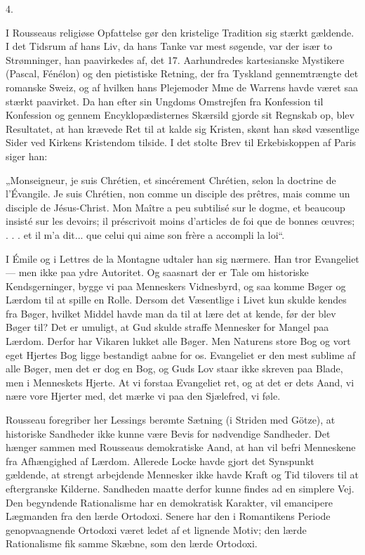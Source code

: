 \documentclass[12pt,a4paper,openany]{book}
\newcommand{\opage}[1]{\marginnote{\footnotesize\textit{[#1]}}}
\begin{document}
\begin{center}4.\end{center}

I Rousseaus religiøse Opfattelse gør den kristelige Tradition
sig stærkt gældende. I det Tidsrum af hans Liv, da hans Tanke
var mest søgende, var der især to Strømninger, han paavirkedes
af, det 17. Aarhundredes kartesianske Mystikere (Pascal,
Fénélon) og den pietistiske Retning, der fra Tyskland gennemtrængte
det romanske Sweiz, og af hvilken hans Plejemoder
Mme de Warrens havde været saa stærkt paavirket. Da han
efter sin Ungdoms Omstrejfen fra Konfession til Konfession og
gennem Encyklopædisternes Skærsild gjorde sit Regnskab op,
blev Resultatet, at han krævede Ret til at kalde sig Kristen,
skønt han skød væsentlige Sider ved Kirkens Kristendom tilside.
I det stolte Brev til Erkebiskoppen af Paris siger han:

„Monseigneur, je suis Chrétien, et sincérement Chrétien,
selon la doctrine de l’Évangile. Je suis Chrétien, non comme
un disciple des prêtres, mais comme un disciple de Jésus-Christ.
Mon Maître a peu subtilisé sur le dogme, et beaucoup insisté
sur les devoirs; il préscrivoit moins d’articles de foi que de
bonnes œuvres; . . . et il m’a dit... que celui qui aime son
frère a accompli la loi“.

I Émile og i Lettres de la Montagne udtaler han sig nærmere.
\setcounter{footnote}{0}%
\opage{156}Han tror Evangeliet --- men ikke paa ydre Autoritet. Og saasnart
der er Tale om historiske Kendsgerninger, bygge vi paa
Menneskers Vidnesbyrd, og saa komme Bøger og Lærdom til
at spille en Rolle. Dersom det Væsentlige i Livet kun skulde
kendes fra Bøger, hvilket Middel havde man da til at lære det
at kende, før der blev Bøger til? Det er umuligt, at Gud skulde
straffe Mennesker for Mangel paa Lærdom. Derfor har Vikaren
lukket alle Bøger. Men Naturens store Bog og vort eget Hjertes
Bog ligge bestandigt aabne for os. Evangeliet er den mest
sublime af alle Bøger, men det er dog en Bog, og Guds Lov
staar ikke skreven paa Blade, men i Menneskets Hjerte. At vi
forstaa Evangeliet ret, og at det er dets Aand, vi nære vore
Hjerter med, det mærke vi paa den Sjælefred, vi føle.

Rousseau foregriber her Lessings berømte Sætning (i Striden
med Götze), at historiske Sandheder ikke kunne være Bevis
for nødvendige Sandheder. Det hænger sammen med Rousseaus
demokratiske Aand, at han vil befri Menneskene fra Afhængighed
af Lærdom. Allerede Locke havde gjort det Synspunkt
gældende, at strengt arbejdende Mennesker ikke havde Kraft
og Tid tilovers til at eftergranske Kilderne. Sandheden maatte
derfor kunne findes ad en simplere Vej. Den begyndende Rationalisme
har en demokratisk Karakter, vil emancipere Lægmanden
fra den lærde Ortodoxi. Senere har den i Romantikens
Periode genopvaagnende Ortodoxi været ledet af et lignende
Motiv; den lærde Rationalisme fik samme Skæbne, som den
lærde Ortodoxi.
\end{document}
